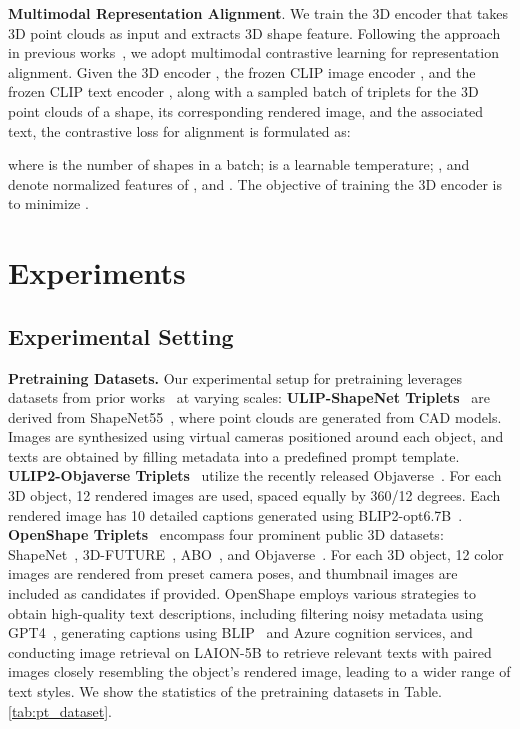 \documentclass{article}
\newcommand{\dsA}{\textcolor{myyellow}{}}
\newcommand{\dsB}{{\textcolor{mygreen}{}}}
\newcommand{\dsC}{{\textcolor{mypurpledeep}{}}}
\begin{document}
\textbf{Multimodal Representation Alignment}.
We train the 3D encoder that takes  3D point clouds as input and extracts 3D shape feature. Following the approach in previous works~\cite{xue2023ulip,xue2023ulip2,liu2023openshape}, we adopt multimodal contrastive learning for representation alignment. Given the 3D encoder , the frozen CLIP image encoder , and the frozen CLIP text encoder , along with a sampled batch of triplets  for the 3D point clouds of a shape, its corresponding rendered image, and the associated text, the contrastive loss for alignment is formulated as:

where  is the number of shapes in a batch;  is a learnable temperature; ,  and  denote normalized features of ,  and .
The objective of training the 3D encoder is to minimize .



\section {Experiments}
\subsection{Experimental Setting}\label{sec:exp_setting}
\textbf{Pretraining Datasets.} Our experimental setup for pretraining leverages datasets from prior works~\cite{xue2023ulip,xue2023ulip2,liu2023openshape} at varying scales:
\dsA \textbf{ULIP-ShapeNet Triplets}~\cite{xue2023ulip} are derived from ShapeNet55~\cite{chang2015shapenet}, where point clouds are generated from CAD models. Images are synthesized using virtual cameras positioned around each object, and texts are obtained by filling metadata into a predefined prompt template.
\dsB \textbf{ULIP2-Objaverse Triplets}~\cite{xue2023ulip2} utilize the recently released Objaverse~\cite{deitke2023objaverse}. For each 3D object, 12 rendered images are used, spaced equally by 360/12 degrees. Each rendered image has 10 detailed captions generated using BLIP2-opt6.7B~\cite{blip2}.
\dsC \textbf{OpenShape Triplets}~\cite{liu2023openshape} encompass four prominent public 3D datasets: ShapeNet~\cite{chang2015shapenet}, 3D-FUTURE~\cite{fu2021-3d-future}, ABO~\cite{collins2022abo}, and Objaverse~\cite{deitke2023objaverse}. For each 3D object, 12 color images are rendered from preset camera poses, and thumbnail images are included as candidates if provided. OpenShape employs various strategies to obtain high-quality text descriptions, including filtering noisy metadata using GPT4~\cite{openai2023gpt4}, generating captions using BLIP~\cite{blip} and Azure cognition services, and conducting image retrieval on LAION-5B to retrieve relevant texts with paired images closely resembling the object's rendered image, leading to a wider range of text styles.
We show the statistics of the pretraining datasets in Table.\ref{tab:pt_dataset}.
\end{document}
